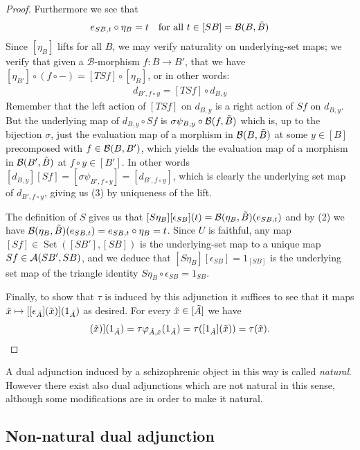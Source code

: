 \documentclass[12pt,a4paper]{article}
\DeclareMathOperator{\Set}{Set}
\def\HomA{\ensuremath\mathcal{A}}
\def\HomB{\ensuremath\mathcal{B}}
\def\t{\ensuremath\tilde}
\begin{document}
\begin{proof}
Furthermore we see that \begin{align}
	e_{SB, t} \circ \eta_B = t \ \ \text{ for all } t \in [SB]= \HomB(B, \t B)
\end{align}
Since $[\eta_B]$ lifts for all $B$, we may verify naturality on underlying-set maps; we verify that given a $\mathcal{B}$-morphism $f: B \to B'$, that we have $ [\eta_{B'}]\circ (f \circ -) = [TSf] \circ [\eta_B]$, or in other words: \begin{align}
	d_{B', f \circ y} = [TSf] \circ d_{B,y}
\end{align} 
Remember that the left action of $[TSf]$ on $d_{B,y}$ is a right action of $Sf$ on $d_{B,y}$. But the underlying map of $d_{B,y} \circ Sf$ is $\sigma \psi_{B,y} \circ \HomB(f, \t B)$ which is, up to the bijection $\sigma$, just the evaluation map of a morphism in $\HomB(B, \t B)$ at some $y \in [B]$ precomposed with $f \in \HomB(B, B')$, which yields the evaluation map of a morphism in $\HomB(B',\t B)$ at $f \circ y \in [B']$. In other words $[d_{B,y}] [Sf] = [\sigma \psi_{B', f \circ y}] = [d_{B', f \circ y}]$, which is clearly the underlying set map of $d_{B', f \circ y}$, giving us (3) by uniqueness of the lift. 



The definition of $S$ gives us that $[S\eta_B][\epsilon_{SB}](t) = \HomB(\eta_B, \t B)(e_{SB, t})$ and by (2) we have $\HomB(\eta_B, \t B)(e_{SB, t}) = e_{SB,t} \circ \eta_B = t$. Since $U$ is faithful, any map $[Sf] \in \Set([SB'], [SB])$ is the underlying-set map to a unique map $Sf \in \HomA(SB', SB)$, and we deduce that $[S\eta_B][\epsilon_{SB}] = 1_{[SB]}$ is the underlying set map of the triangle identity $S\eta_B \circ \epsilon_{SB} = 1_{SB}$.

Finally, to show that $\tau$ is induced by this adjunction it suffices to see that it maps $\t x \mapsto [[\epsilon_{\t A}](\t x)](1_{\t A})$ as desired. For every $\t x \in [\t A]$ we have
\begin{align*}
	[[\epsilon_{\t A}](\t x)](1_{\t A}) = \tau \varphi_{\t A, \t x}(1_{\t A}) = \tau([1_{\t A}](\t x)) = \tau(\t x).
\end{align*}
\end{proof}
A dual adjunction induced by a schizophrenic object in this way is called \emph{natural}. However there exist also dual adjunctions which are not natural in this sense, although some modifications are in order to make it natural. 
\subsection{Non-natural dual adjunction}
\end{document}
